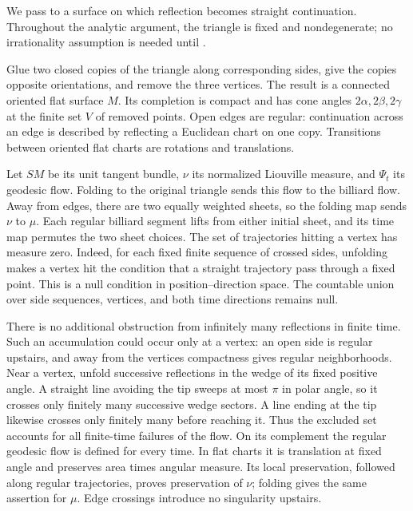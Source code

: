 \documentclass[11pt]{article}
\theoremstyle{remark}
\begin{document}
We pass to a surface on which reflection becomes straight continuation.
Throughout the analytic argument, the triangle is fixed and
nondegenerate; no irrationality assumption is needed until
.

Glue two closed copies of the triangle along corresponding sides, give
the copies opposite orientations, and remove the three vertices. The
result is a connected oriented flat surface \(M\). Its completion is
compact and has cone angles \(2\alpha,2\beta,2\gamma\) at the finite set
\(V\) of removed points. Open edges are regular: continuation across
an edge is described by reflecting a Euclidean chart on one copy.
Transitions between oriented flat charts are rotations and translations.

Let \(SM\) be its unit tangent bundle, \(\nu\) its normalized Liouville
measure, and \(\Psi_t\) its geodesic flow. Folding to the original
triangle sends this flow to the billiard flow. Away from edges, there
are two equally weighted sheets, so the folding map sends \(\nu\) to
\(\mu\). Each regular billiard segment lifts from either initial sheet,
and its time map permutes the two sheet choices.
The set of trajectories hitting a vertex has measure zero.
Indeed, for each fixed finite sequence of crossed sides, unfolding makes
a vertex hit the condition that a straight trajectory pass through a
fixed point. This is a null condition in position--direction space.
The countable union over side sequences, vertices, and both time
directions remains null.

There is no additional obstruction from infinitely many reflections in
finite time. Such an accumulation could occur only at a vertex: an open
side is regular upstairs, and away from the vertices compactness gives
regular neighborhoods. Near a vertex, unfold successive reflections in
the wedge of its fixed positive angle. A straight line avoiding the tip
sweeps at most \(\pi\) in polar angle, so it crosses only finitely many
successive wedge sectors. A line ending at the tip likewise crosses only
finitely many before reaching it. Thus the excluded set accounts for
all finite-time failures of the flow. On its complement the regular
geodesic flow is defined for every time. In flat charts it is translation
at fixed angle and preserves area times angular measure. Its local
preservation, followed along regular trajectories, proves preservation
of \(\nu\); folding gives the same assertion for \(\mu\).
Edge crossings introduce no singularity upstairs.
\end{document}
